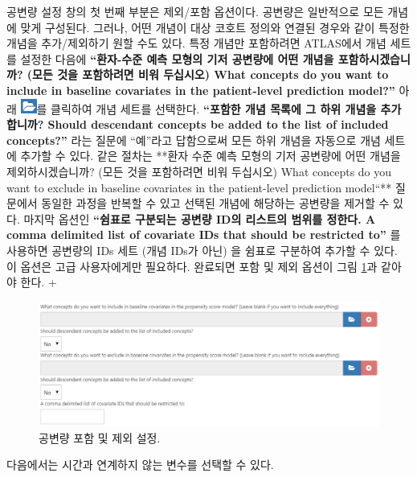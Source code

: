 \documentclass[10.5pt]{book}
\theoremstyle{definition}
\theoremstyle{definition}
\theoremstyle{definition}
\theoremstyle{remark}
\begin{document}
공변량 설정 창의 첫 번째 부분은 제외/포함 옵션이다. 공변량은 일반적으로
모든 개념에 맞게 구성된다. 그러나, 어떤 개념이 대상 코호트 정의와 연결된
경우와 같이 특정한 개념을 추가/제외하기 원할 수도 있다. 특정 개념만
포함하려면 ATLAS에서 개념 세트를 설정한 다음에 \textbf{``환자-수준 예측
모형의 기저 공변량에 어떤 개념을 포함하시겠습니까? (모든 것을 포함하려면
비워 두십시오) What concepts do you want to include in baseline
covariates in the patient-level prediction model?''} 아래
\includegraphics{images/PopulationLevelEstimation/open.png}를 클릭하여
개념 세트를 선택한다. \textbf{``포함한 개념 목록에 그 하위 개념을
추가합니까? Should descendant concepts be added to the list of included
concepts?''} 라는 질문에 ``예''라고 답함으로써 모든 하위 개념을 자동으로
개념 세트에 추가할 수 있다. 같은 절차는 **환자 수준 예측 모형의 기저
공변량에 어떤 개념을 제외하시겠습니까? (모든 것을 포함하려면 비워
두십시오) What concepts do you want to exclude in baseline covariates in
the patient-level prediction model``** 질문에서 동일한 과정을 반복할 수
있고 선택된 개념에 해당하는 공변량을 제거할 수 있다. 마지막 옵션인
\textbf{``쉼표로 구분되는 공변량 ID의 리스트의 범위를 정한다. A comma
delimited list of covariate IDs that should be restricted to''} 를
사용하면 공변량의 IDs 세트 (개념 IDs가 아닌) 을 쉼표로 구분하여 추가할
수 있다. 이 옵션은 고급 사용자에게만 필요하다. 완료되면 포함 및 제외
옵션이 그림 \ref{fig:covariateSettings1}과 같아야 한다. +

\begin{figure}

{\centering \includegraphics[width=1\linewidth]{images/PatientLevelPrediction/covariateSettings1} 

}

\caption{공변량 포함 및 제외 설정.}\label{fig:covariateSettings1}
\end{figure}

다음에서는 시간과 연계하지 않는 변수를 선택할 수 있다.
\end{document}
